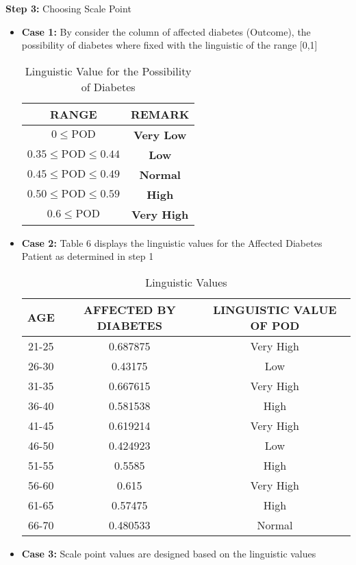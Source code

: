 \documentclass[12pt,a4paper]{article}
\begin{document}
\textbf{Step 3:} Choosing Scale Point

\begin{itemize}

\item \textbf{Case 1:} By consider the column of affected diabetes (Outcome), the possibility of
diabetes where fixed with the linguistic of the range [0,1]
\newpage
\begin{table}[h]
\centering
\begin{tabular}{|c|c|}
\hline
\textbf{RANGE} & \textbf{REMARK} \\
\hline
$0 \leq \text{POD}$  & \textbf{Very Low}  \\
\hline
$0.35 \leq \text{POD} \leq 0.44$  &  \textbf{Low} \\
\hline
$0.45 \leq \text{POD} \leq 0.49$ &  \textbf{Normal} \\
\hline
 $0.50 \leq \text{POD} \leq 0.59$ &  \textbf{High} \\
\hline
$0.6 \leq \text{POD}$ &  \textbf{Very High} \\
\hline
\end{tabular}
\caption{Linguistic Value for the Possibility of Diabetes}
\end{table}
\item \textbf{Case 2:} Table 6 displays the linguistic values for the Affected Diabetes Patient as determined in step 1
\begin{table}[h!]
\centering
\begin{tabular}{|c|c|c|}
\hline
\textbf{AGE} & \textbf{AFFECTED BY DIABETES} & \textbf{LINGUISTIC VALUE OF POD} \\
\hline
21-25 & 0.687875 & Very High \\
\hline
26-30 & 0.43175 & Low \\
\hline
31-35 & 0.667615 & Very High \\
\hline
36-40 & 0.581538 & High \\
\hline
41-45 & 0.619214 & Very High \\
\hline
46-50 & 0.424923 & Low \\
\hline
51-55 & 0.5585 & High \\
\hline
56-60 & 0.615 & Very High \\
\hline
61-65 & 0.57475 & High \\
\hline
66-70 & 0.480533 & Normal \\
\hline
\end{tabular}
\caption{Linguistic Values}
\end{table}
\item \textbf{Case 3:} Scale point values are designed based on the linguistic values


\end{itemize}
\end{document}
